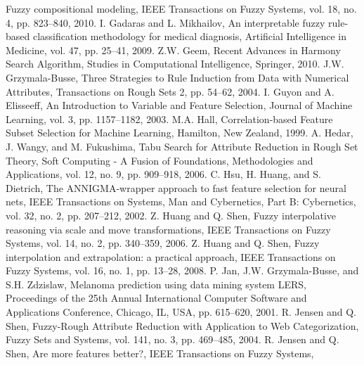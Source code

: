Fuzzy compositional modeling,
IEEE Transactions on Fuzzy Systems,
vol. 18, no. 4,
pp. 823--840,
2010.
I. Gadaras and L. Mikhailov,
An interpretable fuzzy rule-based classification methodology for medical diagnosis,
Artificial Intelligence in Medicine,
vol. 47, pp. 25--41,
2009.
Z.W. Geem,
Recent Advances in Harmony Search Algorithm,
Studies in Computational Intelligence,
Springer,
2010.
J.W. Grzymala-Busse,
Three Strategies to Rule Induction from Data with Numerical Attributes,
Transactions on Rough Sets 2,
pp. 54--62,
2004.
I. Guyon and A. Elisseeff,
An Introduction to Variable and Feature Selection,
Journal of Machine Learning,
vol. 3, pp. 1157--1182,
2003.
M.A. Hall,
Correlation-based Feature Subset Selection for Machine Learning,
Hamilton, New Zealand,
1999.
A. Hedar, J. Wangy, and M. Fukushima,
Tabu Search for Attribute Reduction in Rough Set Theory,
Soft Computing - A Fusion of Foundations, Methodologies and Applications,
vol. 12, no. 9, pp. 909--918,
2006.
C. Hsu, H. Huang, and S. Dietrich,
The ANNIGMA-wrapper approach to fast feature selection for neural nets,
IEEE Transactions on Systems, Man and Cybernetics, Part B: Cybernetics,
vol. 32, no. 2, pp. 207--212,
2002.
Z. Huang and Q. Shen,
Fuzzy interpolative reasoning via scale and move transformations,
IEEE Transactions on Fuzzy Systems,
vol. 14, no. 2, pp. 340--359,
2006.
Z. Huang and Q. Shen,
Fuzzy interpolation and extrapolation: a practical approach,
IEEE Transactions on Fuzzy Systems,
vol. 16, no. 1, pp. 13--28,
2008.
P. Jan, J.W. Grzymala-Busse, and S.H. Zdzislaw,
Melanoma prediction using data mining system LERS,
Proceedings of the 25th Annual International Computer Software and Applications Conference, Chicago, IL, USA,
pp. 615--620,
2001.
R. Jensen and Q. Shen,
Fuzzy-Rough Attribute Reduction with Application to Web Categorization,
Fuzzy Sets and Systems,
vol. 141, no. 3, pp. 469--485,
2004.
R. Jensen and Q. Shen,
Are more features better?,
IEEE Transactions on Fuzzy Systems,
